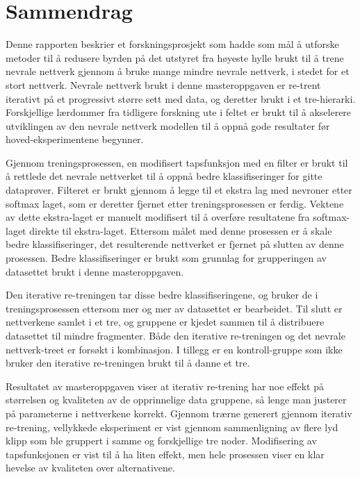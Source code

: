 \chapter*{Sammendrag}

Denne rapporten beskrier et forskningsprosjekt som hadde som mål å utforske metoder til å redusere byrden på det utstyret fra høyeste hylle brukt til å trene nevrale nettverk gjennom å bruke mange mindre nevrale nettverk, i stedet for et stort nettverk.
Nevrale nettverk brukt i denne masteroppgaven er re-trent iterativt på et progressivt større sett med data, og deretter brukt i et tre-hierarki.
Forskjellige lærdommer fra tidligere forskning ute i feltet er brukt til å akselerere utviklingen av den nevrale nettverk modellen til å oppnå gode resultater før hoved-eksperimentene begynner.

Gjennom treningsprosessen, en modifisert tapsfunksjon med en filter er brukt til å rettlede det nevrale nettverket til å oppnå bedre klassifiseringer for gitte dataprøver.
Filteret er brukt gjennom å legge til et ekstra lag med nevroner etter softmax laget, som er deretter fjernet etter treningsprosessen er ferdig.
Vektene av dette ekstra-laget er manuelt modifisert til å overføre resultatene fra softmax-laget direkte til ekstra-laget.
Ettersom målet med denne prosessen er å skale bedre klassifiseringer, det resulterende nettverket er fjernet på slutten av denne prosessen.
Bedre klassifiseringer er brukt som grunnlag for grupperingen av datasettet brukt i denne masteroppgaven.

Den iterative re-treningen tar disse bedre klassifiseringene, og bruker de i treningsprosessen ettersom mer og mer av datasettet er bearbeidet.
Til slutt er nettverkene samlet i et tre, og gruppene er kjedet sammen til å distribuere datasettet til mindre fragmenter.
Både den iterative re-treningen og det nevrale nettverk-treet er forsøkt i kombinasjon.
I tillegg er en kontroll-gruppe som ikke bruker den iterative re-treningen brukt til å danne et tre.

Resultatet av masteroppgaven viser at iterativ re-trening har noe effekt på størrelsen og kvaliteten av de opprinnelige data gruppene, så lenge man justerer på parameterne i nettverkene korrekt.
Gjennom trærne generert gjennom iterativ re-trening, vellykkede eksperiment er vist gjennom sammenligning av flere lyd klipp som ble gruppert i samme og forskjellige tre noder.
Modifisering av tapsfunksjonen er vist til å ha liten effekt, men hele prosessen viser en klar hevelse av kvaliteten over alternativene.